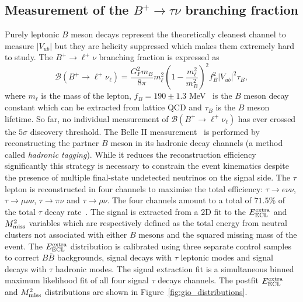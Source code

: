 \documentclass{moriond}
\def\vub{V_{ub}}
\def\eecl{E_{\rm ECL}^{\rm extra}}
\def\mmiss{M_{\rm miss}^2}
\begin{document}
\subsection{Measurement of the $B^+ \to \tau \nu$ branching fraction}
Purely leptonic $B$ meson decays represent the theoretically cleanest channel to measure $|\vub|$ but they are helicity suppressed which makes them extremely hard to study. The $B^+ \to \ell^+ \nu$ branching fraction is expressed as
\begin{equation}
    \mathcal{B}(B^+ \to \ell^+\nu_\ell) = \frac{G_F^2m_B}{8\pi}m_\ell^2\left( 1 - \frac{m_\ell^2}{m_B^2} \right)^2 f_B^2|V_{ub}|^2\tau_B,
\end{equation}
where $m_\ell$ is the mass of the lepton, $f_B = 190 \pm 1.3$ MeV~\cite{flag} is the $B$ meson decay constant which can be extracted from lattice QCD and $\tau_B$ is the $B$ meson lifetime. So far, no individual measurement of $\mathcal{B}(B^+ \to \ell^+\nu_\ell)$ has ever crossed the $5\sigma$ discovery threshold. The Belle II measurement~\cite{gio} is performed by reconstructing the partner $B$ meson in its hadronic decay channels (a method called \textit{hadronic tagging}). While it reduces the reconstruction efficiency significantly this strategy is necessary to constrain the event kinematics despite the presence of multiple final-state undetected neutrinos on the signal side. The $\tau$ lepton is reconstructed in four channels to maximise the total efficiency: $\tau \to e\nu\nu$, $\tau \to \mu\nu\nu$, $\tau \to \pi\nu$ and $\tau \to \rho\nu$. The four channels amount to a total of $71.5\%$ of the total $\tau$ decay rate~\cite{pdg}. The signal is extracted from a 2D fit to the $\eecl$ and $\mmiss$ variables which are respectively defined as the total energy from neutral clusters not associated with either $B$ mesons and the squared missing mass of the event. The $\eecl$ distribution is calibrated using three separate control samples to correct $B\bar{B}$ backgrounds, signal decays with $\tau$ leptonic modes and signal decays with $\tau$ hadronic modes. The signal extraction fit is a simultaneous binned maximum likelihood fit of all four signal $\tau$ decays channels. The postfit $\eecl$ and $\mmiss$ distributions are shown in Figure~\ref{fig:gio_distributions}.
\end{document}
